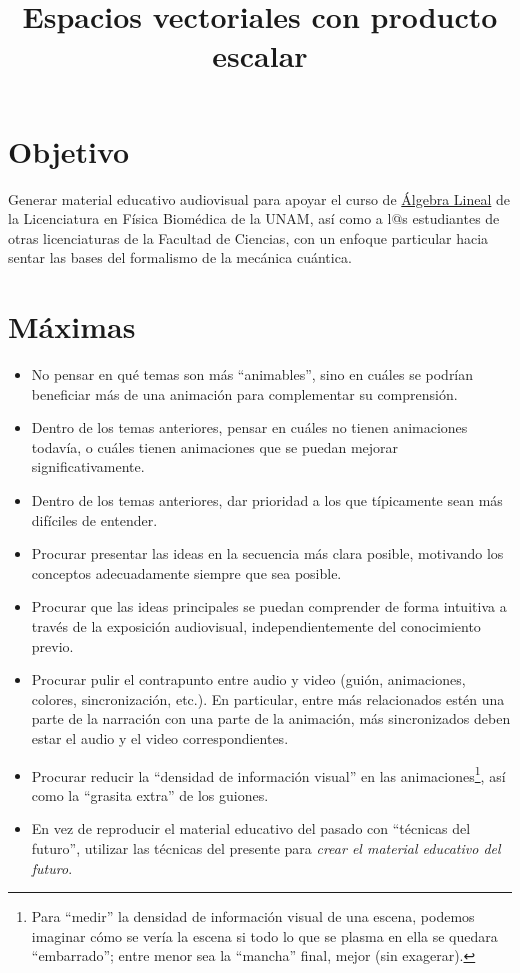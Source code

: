 \documentclass[12pt,dvipsnames]{article}
\numberwithin{equation}{section}
\begin{document}
\title{Espacios vectoriales con producto escalar}
\date{}
\maketitle

\section{Objetivo}
Generar material educativo audiovisual para apoyar el curso de \href{http://www.fciencias.unam.mx/licenciatura/asignaturas/2016/1330}{Álgebra Lineal} de la Licenciatura en Física Biomédica de la UNAM, así como a l@s estudiantes de otras licenciaturas de la Facultad de Ciencias, con un enfoque particular hacia sentar las bases del formalismo de la mecánica cuántica.

\section{Máximas}

\begin{itemize}
    \item No pensar en qué temas son más ``animables'', sino en cuáles se podrían beneficiar más de una animación para complementar su comprensión.
    \item Dentro de los temas anteriores, pensar en cuáles no tienen animaciones todavía, o cuáles tienen animaciones que se puedan mejorar significativamente.
    \item Dentro de los temas anteriores, dar prioridad a los que típicamente sean más difíciles de entender.
    \item Procurar presentar las ideas en la secuencia más clara posible, motivando los conceptos adecuadamente siempre que sea posible.
    \item Procurar que las ideas principales se puedan comprender de forma intuitiva a través de la exposición audiovisual, independientemente del conocimiento previo.
    \item Procurar pulir el contrapunto entre audio y video (guión, animaciones, colores, sincronización, etc.). En particular, entre más relacionados estén una parte de la narración con una parte de la animación, más sincronizados deben estar el audio y el video correspondientes.
    \item Procurar reducir la ``densidad de información visual'' en las animaciones\footnote{Para ``medir'' la densidad de información visual de una escena, podemos imaginar cómo se vería la escena si todo lo que se plasma en ella se quedara ``embarrado''; entre menor sea la ``mancha'' final, mejor (sin exagerar).}, así como la ``grasita extra'' de los guiones.
    \item En vez de reproducir el material educativo del pasado con ``técnicas del futuro'', utilizar las técnicas del presente para \emph{crear el material educativo del futuro}.
\end{itemize}
\end{document}
